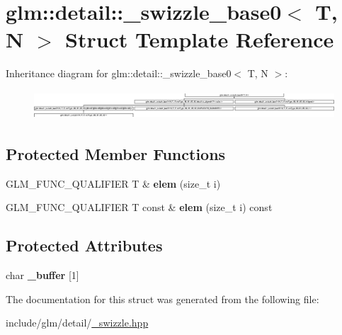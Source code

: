 \hypertarget{structglm_1_1detail_1_1__swizzle__base0}{}\section{glm\+:\+:detail\+:\+:\+\_\+swizzle\+\_\+base0$<$ T, N $>$ Struct Template Reference}
\label{structglm_1_1detail_1_1__swizzle__base0}
Inheritance diagram for glm\+:\+:detail\+:\+:\+\_\+swizzle\+\_\+base0$<$ T, N $>$\+:\begin{figure}[H]
\begin{center}
\leavevmode
\includegraphics[height=1.082126cm]{structglm_1_1detail_1_1__swizzle__base0}
\end{center}
\end{figure}
\subsection*{Protected Member Functions}
\begin{DoxyCompactItemize}
\item 
\mbox{\label{structglm_1_1detail_1_1__swizzle__base0_a4011ff1a445ccda72c385462106eb3ff}} 
G\+L\+M\+\_\+\+F\+U\+N\+C\+\_\+\+Q\+U\+A\+L\+I\+F\+I\+ER T \& {\bfseries elem} (size\+\_\+t i)
\item 
\mbox{\label{structglm_1_1detail_1_1__swizzle__base0_a495081f60b8fc565a5a35bfdd8b13c84}} 
G\+L\+M\+\_\+\+F\+U\+N\+C\+\_\+\+Q\+U\+A\+L\+I\+F\+I\+ER T const  \& {\bfseries elem} (size\+\_\+t i) const
\end{DoxyCompactItemize}
\subsection*{Protected Attributes}
\begin{DoxyCompactItemize}
\item 
\mbox{\label{structglm_1_1detail_1_1__swizzle__base0_afd4b7f15c9acff4cdef808f559ffec2d}} 
char {\bfseries \+\_\+buffer} \mbox{[}1\mbox{]}
\end{DoxyCompactItemize}


The documentation for this struct was generated from the following file\+:\begin{DoxyCompactItemize}
\item 
include/glm/detail/\hyperlink{__swizzle_8hpp}{\+\_\+swizzle.\+hpp}\end{DoxyCompactItemize}
